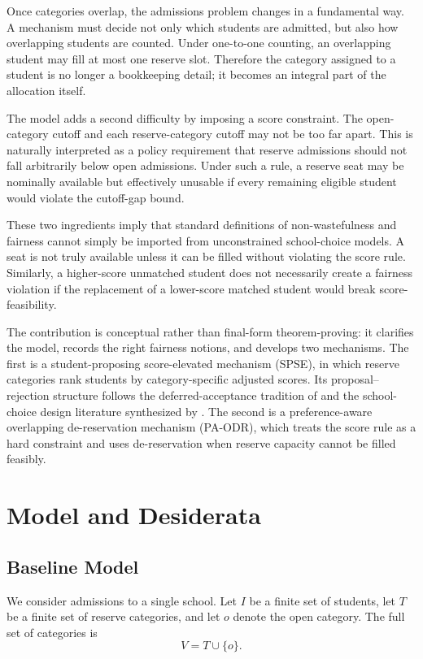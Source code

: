 \documentclass[12pt]{article}
\newcommand{\1}{\mathbf{1}}
\begin{document}
Once categories overlap, the admissions problem changes in a fundamental way. A mechanism must decide not only which students are admitted, but also how overlapping students are counted. Under one-to-one counting, an overlapping student may fill at most one reserve slot. Therefore the category assigned to a student is no longer a bookkeeping detail; it becomes an integral part of the allocation itself.

The model adds a second difficulty by imposing a score constraint. The open-category cutoff and each reserve-category cutoff may not be too far apart. This is naturally interpreted as a policy requirement that reserve admissions should not fall arbitrarily below open admissions. Under such a rule, a reserve seat may be nominally available but effectively unusable if every remaining eligible student would violate the cutoff-gap bound.

These two ingredients imply that standard definitions of non-wastefulness and fairness cannot simply be imported from unconstrained school-choice models. A seat is not truly available unless it can be filled without violating the score rule. Similarly, a higher-score unmatched student does not necessarily create a fairness violation if the replacement of a lower-score matched student would break score-feasibility.

The contribution is conceptual rather than final-form theorem-proving: it clarifies the model, records the right fairness notions, and develops two mechanisms. The first is a student-proposing score-elevated mechanism (SPSE), in which reserve categories rank students by category-specific adjusted scores. Its proposal--rejection structure follows the deferred-acceptance tradition of \citet{GaSh62a} and the school-choice design literature synthesized by \citet{AbSo03b,Roth08a}. The second is a preference-aware overlapping de-reservation mechanism (PA-ODR), which treats the score rule as a hard constraint and uses de-reservation when reserve capacity cannot be filled feasibly.


\section{Model and Desiderata}

\subsection{Baseline Model}
We consider admissions to a single school. Let $I$ be a finite set of students, let $T$ be a finite set of reserve categories, and let $o$ denote the open category. The full set of categories is
\[
V=T\cup\{o\}.
\]
\end{document}
